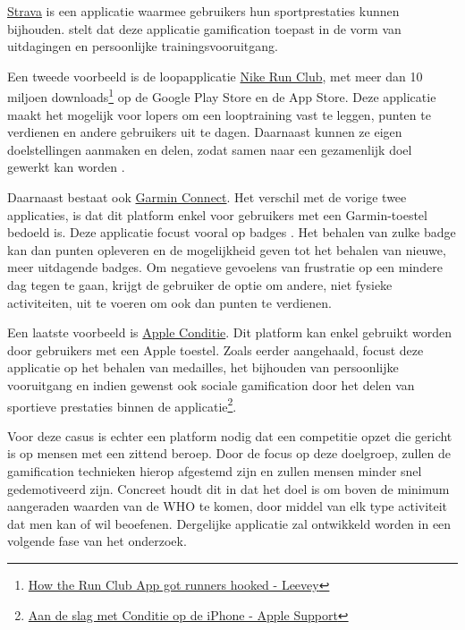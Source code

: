 \href{https://www.strava.com/}{Strava} is een applicatie waarmee gebruikers hun sportprestaties kunnen bijhouden. \textcite{Barratt2017} stelt dat deze applicatie gamification toepast in de vorm van uitdagingen en persoonlijke trainingsvooruitgang.

Een tweede voorbeeld is de loopapplicatie \href{https://www.nike.com/be/en/nrc-app}{Nike Run Club}, met meer dan 10 miljoen downloads\footnote{\href{https://bootcamp.uxdesign.cc/how-the-nike-run-club-app-got-runners-hooked-2850c7654fc5}{How the Run Club App got runners hooked - Leevey}} op de Google Play Store en de App Store. Deze applicatie maakt het mogelijk voor lopers om een looptraining vast te leggen, punten te verdienen en andere gebruikers uit te dagen. Daarnaast kunnen ze eigen doelstellingen aanmaken en delen, zodat samen naar een gezamenlijk doel gewerkt kan worden \autocite{StaalnackeLarsson2013}.

Daarnaast bestaat ook \href{https://connect.garmin.com/}{Garmin Connect}. Het verschil met de vorige twee applicaties, is dat dit platform enkel voor gebruikers met een Garmin-toestel bedoeld is. Deze applicatie focust vooral op badges \autocite{Ilhan2019}. Het behalen van zulke badge kan dan punten opleveren en de mogelijkheid geven tot het behalen van nieuwe, meer uitdagende badges. Om negatieve gevoelens van frustratie op een mindere dag tegen te gaan, krijgt de gebruiker de optie om andere, niet fysieke activiteiten, uit te voeren om ook dan punten te verdienen.

Een laatste voorbeeld is \href{https://support.apple.com/nl-be/guide/iphone/ipha5dddb411/ios}{Apple Conditie}. Dit platform kan enkel gebruikt worden door gebruikers met een Apple toestel. Zoals eerder aangehaald, focust deze applicatie op het behalen van medailles, het bijhouden van persoonlijke vooruitgang en indien gewenst ook sociale gamification door het delen van sportieve prestaties binnen de applicatie\footnote{\href{https://support.apple.com/nl-be/guide/iphone/ipha5dddb411/ios}{Aan de slag met Conditie op de iPhone - Apple Support}}.

Voor deze casus is echter een platform nodig dat een competitie opzet die gericht is op mensen met een zittend beroep. Door de focus op deze doelgroep, zullen de gamification technieken hierop afgestemd zijn en zullen mensen minder snel gedemotiveerd zijn. Concreet houdt dit in dat het doel is om boven de minimum aangeraden waarden van de WHO te komen, door middel van elk type activiteit dat men kan of wil beoefenen. Dergelijke applicatie zal ontwikkeld worden in een volgende fase van het onderzoek.
